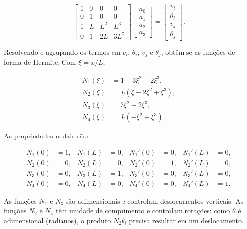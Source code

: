 \documentclass[12pt,a4paper]{article}
\begin{document}
\begin{equation}
  \begin{bmatrix}
    1 & 0 & 0 & 0\\
    0 & 1 & 0 & 0\\
    1 & L & L^2 & L^3\\
    0 & 1 & 2L & 3L^2
  \end{bmatrix}
  \begin{bmatrix}
    a_0\\a_1\\a_2\\a_3
  \end{bmatrix}
  =
  \begin{bmatrix}
    v_i\\\theta_i\\v_j\\\theta_j
  \end{bmatrix}.
  \label{eq:sistema_hermite}
\end{equation}

Resolvendo e agrupando os termos em \(v_i\), \(\theta_i\), \(v_j\) e \(\theta_j\), obtêm-se as funções de forma de Hermite. Com \(\xi=x/L\),

\begin{align}
  N_1(\xi) &= 1 - 3\xi^2 + 2\xi^3, \label{eq:N1}\\
  N_2(\xi) &= L\left(\xi - 2\xi^2 + \xi^3\right), \label{eq:N2}\\
  N_3(\xi) &= 3\xi^2 - 2\xi^3, \label{eq:N3}\\
  N_4(\xi) &= L\left(-\xi^2 + \xi^3\right). \label{eq:N4}
\end{align}

As propriedades nodais são:

\begin{align}
  N_1(0)&=1, & N_1(L)&=0, & N_1'(0)&=0, & N_1'(L)&=0, \label{eq:p1}\\
  N_2(0)&=0, & N_2(L)&=0, & N_2'(0)&=1, & N_2'(L)&=0, \label{eq:p2}\\
  N_3(0)&=0, & N_3(L)&=1, & N_3'(0)&=0, & N_3'(L)&=0, \label{eq:p3}\\
  N_4(0)&=0, & N_4(L)&=0, & N_4'(0)&=0, & N_4'(L)&=1. \label{eq:p4}
\end{align}

As funções \(N_1\) e \(N_3\) são adimensionais e controlam deslocamentos verticais. As funções \(N_2\) e \(N_4\) têm unidade de comprimento e controlam rotações: como \(\theta\) é adimensional (radianos), o produto \(N_2\theta_i\) precisa resultar em um deslocamento.
\end{document}
